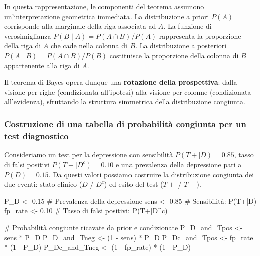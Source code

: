 \documentclass[
  letterpaper,
  DIV=11,
  numbers=noendperiod,
  oneside]{scrreprt}
\newenvironment{Shaded}{\begin{snugshade}}{\end{snugshade}}
\newcommand{\CommentTok}[1]{\textcolor[rgb]{0.37,0.37,0.37}{#1}}
\newcommand{\DecValTok}[1]{\textcolor[rgb]{0.68,0.00,0.00}{#1}}
\newcommand{\FloatTok}[1]{\textcolor[rgb]{0.68,0.00,0.00}{#1}}
\newcommand{\NormalTok}[1]{\textcolor[rgb]{0.00,0.23,0.31}{#1}}
\newcommand{\OtherTok}[1]{\textcolor[rgb]{0.00,0.23,0.31}{#1}}
\newcommand{\SpecialCharTok}[1]{\textcolor[rgb]{0.37,0.37,0.37}{#1}}
\theoremstyle{definition}
\theoremstyle{plain}
\theoremstyle{definition}
\theoremstyle{remark}
\begin{document}
In questa rappresentazione, le componenti del teorema assumono
un'interpretazione geometrica immediata. La distribuzione a priori
\(P(A)\) corrisponde alla marginale della riga associata ad \(A\). La
funzione di verosimiglianza \(P(B \mid A) = P(A \cap B) / P(A)\)
rappresenta la proporzione della riga di \(A\) che cade nella colonna di
\(B\). La distribuzione a posteriori
\(P(A \mid B) = P(A \cap B) / P(B)\) costituisce la proporzione della
colonna di \(B\) appartenente alla riga di \(A\).

Il teorema di Bayes opera dunque una \textbf{rotazione della
prospettiva}: dalla visione per righe (condizionata all'ipotesi) alla
visione per colonne (condizionata all'evidenza), sfruttando la struttura
simmetrica della distribuzione congiunta.

\subsubsection{Costruzione di una tabella di probabilità congiunta per
un test
diagnostico}\label{costruzione-di-una-tabella-di-probabilituxe0-congiunta-per-un-test-diagnostico}

Consideriamo un test per la depressione con sensibilità
\(P(T+ \mid D)=0.85\), tasso di falsi positivi \(P(T+ \mid D^c)=0.10\) e
una prevalenza della depressione pari a \(P(D)=0.15\). Da questi valori
possiamo costruire la distribuzione congiunta dei due eventi: stato
clinico (\(D\) / \(D^c\)) ed esito del test (\(T+\) / \(T-\)).

\begin{Shaded}
\begin{Highlighting}[]
\NormalTok{P\_D }\OtherTok{\textless{}{-}} \FloatTok{0.15}        \CommentTok{\# Prevalenza della depressione}
\NormalTok{sens }\OtherTok{\textless{}{-}} \FloatTok{0.85}       \CommentTok{\# Sensibilità: P(T+|D)}
\NormalTok{fp\_rate }\OtherTok{\textless{}{-}} \FloatTok{0.10}    \CommentTok{\# Tasso di falsi positivi: P(T+|D\^{}c)}
\end{Highlighting}
\end{Shaded}

\begin{Shaded}
\begin{Highlighting}[]
\CommentTok{\# Probabilità congiunte ricavate da prior e condizionate}
\NormalTok{P\_D\_and\_Tpos  }\OtherTok{\textless{}{-}}\NormalTok{ sens }\SpecialCharTok{*}\NormalTok{ P\_D}
\NormalTok{P\_D\_and\_Tneg  }\OtherTok{\textless{}{-}}\NormalTok{ (}\DecValTok{1} \SpecialCharTok{{-}}\NormalTok{ sens) }\SpecialCharTok{*}\NormalTok{ P\_D}
\NormalTok{P\_Dc\_and\_Tpos }\OtherTok{\textless{}{-}}\NormalTok{ fp\_rate }\SpecialCharTok{*}\NormalTok{ (}\DecValTok{1} \SpecialCharTok{{-}}\NormalTok{ P\_D)}
\NormalTok{P\_Dc\_and\_Tneg }\OtherTok{\textless{}{-}}\NormalTok{ (}\DecValTok{1} \SpecialCharTok{{-}}\NormalTok{ fp\_rate) }\SpecialCharTok{*}\NormalTok{ (}\DecValTok{1} \SpecialCharTok{{-}}\NormalTok{ P\_D)}
\end{Highlighting}
\end{Shaded}
\end{document}
